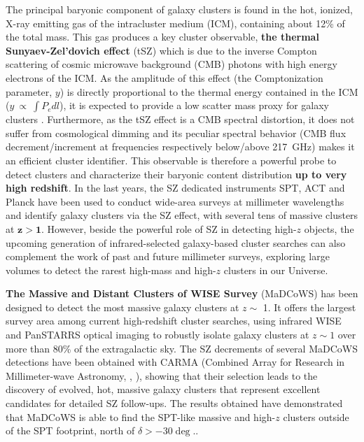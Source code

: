 \documentclass[11pt,a4paper,twoside,graphicx,color]{article}
\begin{document}
The principal baryonic component of galaxy clusters is found in the hot, ionized, X-ray emitting gas of the intracluster medium (ICM), containing about 12\% of the total mass. This gas produces a key cluster observable, \textbf{the thermal Sunyaev-Zel'dovich effect} (tSZ) \cite{sun72} which is due to the inverse Compton scattering of cosmic microwave background (CMB) photons with high energy electrons of the ICM. As the amplitude of this effect (the Comptonization parameter, $y$) is directly proportional to the thermal energy contained in the ICM ($y~\propto~\int P_e dl$), it is expected to provide a low scatter mass proxy for galaxy clusters \cite{nag07}. Furthermore, as the tSZ effect is a CMB spectral distortion, it does not suffer from cosmological dimming and its peculiar spectral behavior (CMB flux decrement/increment at frequencies respectively below/above 217~GHz) makes it an efficient cluster identifier. This observable is therefore a powerful probe to detect clusters and characterize their baryonic content distribution \textbf{up to very high redshift}.
In the last years, the SZ dedicated instruments SPT, ACT and Planck have been used to conduct wide-area surveys at millimeter wavelengths and identify galaxy clusters via the SZ effect, with several tens of massive clusters at $\mathbf{z > 1}$. However, beside the powerful role of SZ in detecting high-$z$ objects, the upcoming generation of infrared-selected galaxy-based cluster searches can also complement the work of past and future millimeter surveys, exploring large volumes to detect the rarest high-mass and high-$z$ clusters in our Universe. 

\textbf{The Massive and Distant Clusters of WISE Survey} (MaDCoWS) has been designed to detect the most massive galaxy clusters at $z \sim$ 1. It offers the largest survey area among current high-redshift cluster searches, using infrared WISE and PanSTARRS optical imaging to robustly isolate galaxy clusters at $z \sim 1$ over more than 80\% of the extragalactic sky. The SZ decrements of several MaDCoWS detections have been obtained with CARMA (Combined Array for Research in Millimeter-wave Astronomy, \cite{brodwin15}, \cite{gonz15}), showing that their selection leads to the discovery of evolved, hot, massive galaxy clusters that represent excellent candidates for detailed SZ follow-ups. The results obtained have demonstrated that MaDCoWS is able to find the SPT-like massive and high-$z$ clusters outside of the SPT footprint, north of $\delta > -30\deg$..
\end{document}
